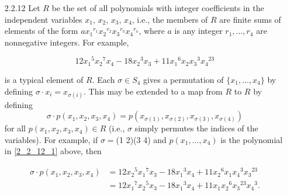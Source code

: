 \begin{enumerate}
      \textbf{Proof.} Let $A$ be a nonempty subset of a group $G$. We know that
      $C_G(A) \le N_G(A)$. Now if $g \in Z(G)$, then $g$ commutes with all the
      elements of $G$; particularly, $g$ must commute with all the elements of
      $A$, so that $g \in C_G(A)$; thus $Z(G) \subseteq C_G(A)$. Since $Z(G)$ is
      a subgroup of $G$, it follows that $Z(G) \le C_G(A) \le N_G(A)$. \qed
   \item[2.2.12]  Let $R$ be the set of all polynomials with integer
                  coefficients in the independent variables $x_1$, $x_2$, $x_3$,
                  $x_4$, i.e., the members of $R$ are finite sums of elements of
                  the form ${ax_1}^{r_1}{x_2}^{r_2}{x_3}^{r_3}{x_4}^{r_4}$,
                  where $a$ is any integer $r_1, \ldots, r_4$ are nonnegative
                  integers. For example,

                  \begin{equation} \label{2_2_12_1}
                     12{x_1}^5{x_2}^7x_4 - 18{x_2}^3x_3 +
                        11{x_1}^6x_2{x_3}^3{x_4}^{23}
                  \end{equation}

                  is a typical element of $R$. Each $\sigma \in S_4$ gives a
                  permutation of $\{x_1, \ldots, x_4\}$ by defining
                  $\sigma \cdot x_i = x_{\sigma(i)}$. This may be extended to a
                  map from $R$ to $R$ by defining
                  $$\sigma \cdot p(x_1, x_2, x_3, x_4) = p(x_{\sigma(1)},
                    x_{\sigma(2)}, x_{\sigma(3)}, x_{\sigma(4)})$$
                  for all $p(x_1, x_2, x_3, x_4) \in R$ (i.e., $\sigma$ simply
                  permutes the indices of the variables). For example, if
                  $\sigma =$(1 2)(3 4) and $p(x_1, \ldots, x_4)$ is the
                  polynomial in \eqref{2_2_12_1} above, then

                  \begin{align*}
                     \sigma \cdot p(x_1, x_2, x_3, x_4) &= 12{x_2}^5{x_1}^7x_3 -
                        18{x_1}^3x_4 + 11{x_2}^6x_1{x_4}^3{x_3}^{23} \\
                        &= 12{x_1}^7{x_2}^5x_3 -
                        18{x_1}^3x_4 + 11x_1{x_2}^6{x_3}^{23}{x_4}^3.
                  \end{align*}


\end{enumerate}
